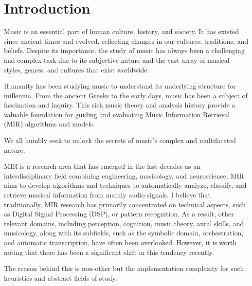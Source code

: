 \chapter{Introduction}

Music is an essential part of human culture, history, and society. It has existed since ancient times and evolved, reflecting changes in our cultures, traditions, and beliefs. Despite its importance, the study of music has always been a challenging and complex task due to its subjective nature and the vast array of musical styles, genres, and cultures that exist worldwide.

Humanity has been studying music to understand its underlying structure for millennia. From the ancient Greeks to the early days, music has been a subject of fascination and inquiry. This rich music theory and analysis history provide a valuable foundation for guiding and evaluating Music Information Retrieval (MIR) algorithms and models. 

We all humbly seek to unlock the secrets of music's complex and multifaceted nature.

MIR is a research area that has emerged in the last decades as an interdisciplinary field combining engineering, musicology, and neuroscience. MIR aims to develop algorithms and techniques to automatically analyze, classify, and retrieve musical information from mainly audio signals. I believe that traditionally, MIR research has primarily concentrated on technical aspects, such as Digital Signal Processing (DSP), or pattern recognition. As a result, other relevant domains, including perception, cognition, music theory, aural skills, and musicology, along with its subfields, such as the symbolic domain, orchestration, and automatic transcription, have often been overlooked. However, it is worth noting that there has been a significant shift in this tendency recently.

The reason behind this is non-other but the implementation complexity for such heuristics and abstract fields of study.